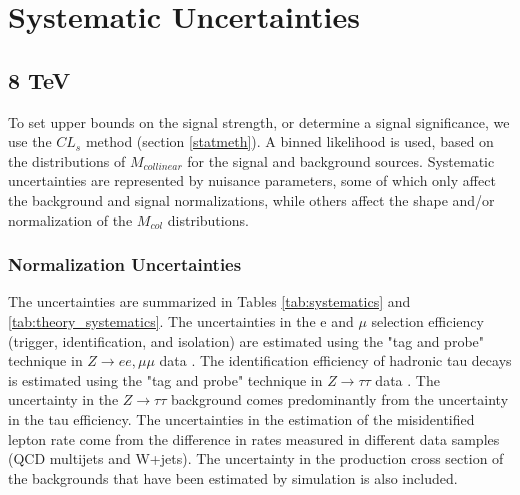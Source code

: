 \documentclass[oneside, letterpaper, oldfontcommands]{memoir}
\begin{document}
\section{Systematic Uncertainties}\label{sysuncert}
\subsection{8 TeV}

\qquad To set upper bounds on the signal strength, or determine a signal significance, we use the $CL_{s}$ method (section \ref{statmeth}).  A binned likelihood is used, based on the distributions of $M_{collinear}$ for the signal and background sources. Systematic uncertainties are represented by nuisance parameters, some of which only affect the background and signal normalizations, while others affect the shape and/or normalization of the $M_{col}$ distributions. 

\subsubsection{Normalization Uncertainties}\label{normsys}

\qquad The uncertainties are summarized in Tables \ref{tab:systematics} and \ref{tab:theory_systematics}. The uncertainties in the e and $\mu$ selection efficiency (trigger, identification, and isolation) are estimated using the "tag and probe" technique in $Z \rightarrow ee,\mu\mu$ data \cite{Chatrchyan:2014mua}. The identification efficiency of hadronic tau decays is estimated using the "tag and probe" technique in $Z \rightarrow \tau\tau$ data \cite{1748-0221-7-01-P01001}. The uncertainty in the $Z \rightarrow \tau\tau$ background comes predominantly from the uncertainty in the tau efficiency. The uncertainties in the estimation of the misidentified lepton rate come from the difference in rates measured in different data samples (QCD multijets and W+jets). The uncertainty in the production cross section of the backgrounds that have been estimated by simulation is also included.
\end{document}
